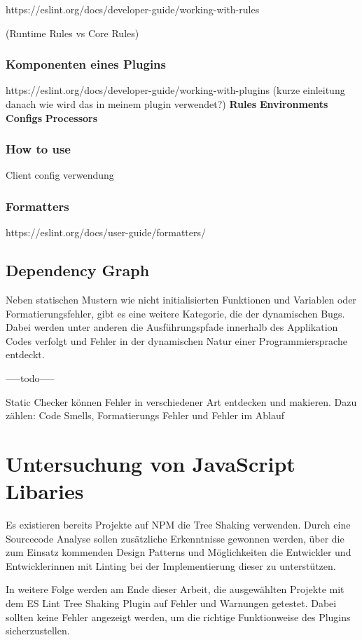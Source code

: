 https://eslint.org/docs/developer-guide/working-with-rules

(Runtime Rules vs Core Rules)

\subsubsection{Komponenten eines Plugins}
https://eslint.org/docs/developer-guide/working-with-plugins
(kurze einleitung  danach wie wird das in meinem plugin verwendet?)
\textbf{Rules}
\textbf{Environments}
\textbf{Configs}
\textbf{Processors}

\subsubsection{How to use}
Client config verwendung

\subsubsection{Formatters}
https://eslint.org/docs/user-guide/formatters/

\subsection{Dependency Graph}
Neben statischen Mustern wie nicht initialisierten Funktionen und Variablen oder Formatierungsfehler, gibt es eine weitere Kategorie, die der dynamischen Bugs. Dabei werden unter anderen die Ausführungspfade innerhalb des Applikation Codes verfolgt und Fehler in der dynamischen Natur einer Programmiersprache entdeckt. \autocite{Bush}

-----todo-----

Static Checker können Fehler in verschiedener Art entdecken und makieren. Dazu zählen: Code Smells, Formatierungs Fehler und Fehler im Ablauf 

\section{Untersuchung von JavaScript Libaries}
Es existieren bereits Projekte auf NPM die Tree Shaking verwenden. Durch eine Sourcecode Analyse sollen zusätzliche Erkenntnisse gewonnen werden, über die zum Einsatz kommenden Design Patterns und Möglichkeiten die Entwickler und Entwicklerinnen mit Linting bei der Implementierung dieser zu unterstützen.

In weitere Folge werden am Ende dieser Arbeit, die ausgewählten Projekte mit dem ES Lint Tree Shaking Plugin auf Fehler und Warnungen getestet. Dabei sollten keine Fehler angezeigt werden, um die richtige Funktionweise des Plugins sicherzustellen.

